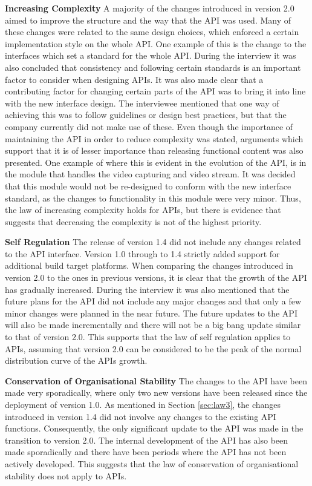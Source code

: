 \documentclass{sig-alternate}
\begin{document}
\smallskip \noindent
\textbf{Increasing Complexity} \label{sec:law2} 
A majority of the changes introduced in version 2.0 aimed to improve the structure and the way that the API was used. Many of these changes were related to the same design choices, which enforced a certain implementation style on the whole API. One example of this is the change to the interfaces which set a standard for the whole API. During the interview it was also concluded that consistency and following certain standards is an important factor to consider when designing APIs. It was also made clear that a contributing factor for changing certain parts of the API was to bring it into line with the new interface design. The interviewee mentioned that one way of achieving this was to follow guidelines or design best practices, but that the company currently did not make use of these. Even though the importance of maintaining the API in order to reduce complexity was stated, arguments which support that it is of lesser importance than releasing functional content was also presented. One example of where this is evident in the evolution of the API, is in the module that handles the video capturing and video stream. It was decided that this module would not be re-designed to conform with the new interface standard, as the changes to functionality in this module were very minor. Thus, the law of increasing complexity holds for APIs, but there is evidence that suggests that decreasing the complexity is not of the highest priority. 

\smallskip \noindent
\textbf{Self Regulation} \label{sec:law3} 
The release of version 1.4 did not include any changes related to the API interface. Version 1.0 through to 1.4 strictly added support for additional build target platforms. When comparing the changes introduced in version 2.0 to the ones in previous versions, it is clear that the growth of the API has gradually increased. During the interview it was also mentioned that the future plans for the API did not include any major changes and that only a few minor changes were planned in the near future. The future updates to the API will also be made incrementally and there will not be a big bang update similar to that of version 2.0. This supports that the law of self regulation applies to APIs, assuming that version 2.0 can be considered to be the peak of the normal distribution curve of the APIs growth. 

\smallskip \noindent
\textbf{Conservation of Organisational Stability} 
The changes to the API have been made very sporadically, where only two new versions have been released since the deployment of version 1.0. As mentioned in Section \ref{sec:law3}, the changes introduced in version 1.4 did not involve any changes to the existing API functions. Consequently, the only significant update to the API was made in the transition to version 2.0. The internal development of the API has also been made sporadically and there have been periods where the API has not been actively developed. This suggests that the law of conservation of organisational stability does not apply to APIs. 
\end{document}
